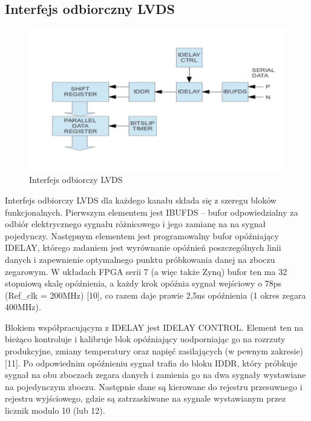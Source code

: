 \documentclass[a4paper,11pt,oneside]{book}  %
\begin{document}
\subsection{Interfejs odbiorczny LVDS}

\begin{figure}[H]
	\centering
	\includegraphics[width=16cm]{data5.png}
	\caption{Interfejs odbiorczy LVDS}
	\label{fig:Zynq5}
\end{figure}

Interfejs odbiorczy LVDS dla każdego kanału składa się z szeregu bloków funkcjonalnych. Pierwszym elementem jest IBUFDS – bufor odpowiedzialny za odbiór elektrycznego sygnału różnicowego i jego zamianę na na sygnał pojedynczy. Następnym elementem jest programowalny bufor opóźniający IDELAY, którego zadaniem jest wyrównanie opóźnień poszczególnych linii danych i zapewnienie optymalnego punktu próbkowania danej na zboczu zegarowym. W układach FPGA serii 7 (a więc także Zynq) bufor ten ma 32 stopniową skalę opóźnienia, a każdy krok opóźnia sygnał wejściowy o 78ps (Ref\_clk = 200MHz) [10], co razem daje prawie 2,5ns opóźnienia (1 okres zegara 400MHz). 

Blokiem współpracującym z IDELAY jest IDELAY CONTROL. Element ten na bieżąco kontroluje i kalibruje blok opóźniający uodporniając go na rozrzuty produkcyjne, zmiany temperatury oraz napięć zasilających (w pewnym zakresie) [11]. Po odpowiednim opóźnieniu sygnał trafia do bloku IDDR, który próbkuje sygnał na obu zboczach zegara danych i zamienia go na dwa sygnały wystawiane na pojedynczym zboczu. Następnie dane są kierowane do rejestru przesuwnego i rejestru wyjściowego, gdzie są zatrzaskiwane na sygnale wystawianym przez licznik modulo 10 (lub 12).
\end{document}
